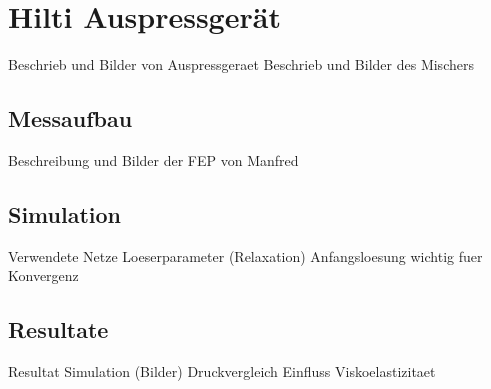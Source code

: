 \section{Hilti Auspressgerät}
\label{Kapitel:Auspressgeraet}
\begin{todocontent}
    \1 Beschrieb und Bilder von Auspressgeraet
    \1 Beschrieb und Bilder des Mischers
\end{todocontent}
%
\subsection{Messaufbau}
\begin{todocontent}
    \1 Beschreibung und Bilder der FEP von Manfred
\end{todocontent}
%
\subsection{Simulation}
\begin{todocontent}
    \1 Verwendete Netze
    \1 Loeserparameter (Relaxation)
    \1 Anfangsloesung wichtig fuer Konvergenz
\end{todocontent}
%
\subsection{Resultate}
\begin{todocontent}
    \1 Resultat Simulation (Bilder)
    \1 Druckvergleich
    \1 Einfluss Viskoelastizitaet
\end{todocontent}
